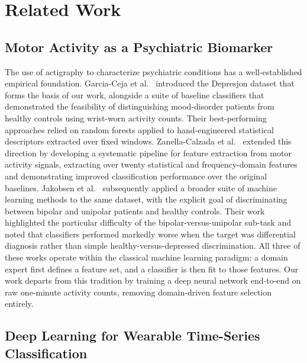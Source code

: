 \section{Related Work}
\label{sec:related}

\subsection{Motor Activity as a Psychiatric Biomarker}

The use of actigraphy to characterize psychiatric conditions has a well-established empirical foundation. Garcia-Ceja et al.\ \cite{garcia2018depresjon} introduced the Depresjon dataset that forms the basis of our work, alongside a suite of baseline classifiers that demonstrated the feasibility of distinguishing mood-disorder patients from healthy controls using wrist-worn activity counts. Their best-performing approaches relied on random forests applied to hand-engineered statistical descriptors extracted over fixed windows. Zanella-Calzada et al.\ \cite{zanella2019feature} extended this direction by developing a systematic pipeline for feature extraction from motor activity signals, extracting over twenty statistical and frequency-domain features and demonstrating improved classification performance over the original baselines. Jakobsen et al.\ \cite{jakobsen2020applying} subsequently applied a broader suite of machine learning methods to the same dataset, with the explicit goal of discriminating between bipolar and unipolar patients and healthy controls. Their work highlighted the particular difficulty of the bipolar-versus-unipolar sub-task and noted that classifiers performed markedly worse when the target was differential diagnosis rather than simple healthy-versus-depressed discrimination. All three of these works operate within the classical machine learning paradigm: a domain expert first defines a feature set, and a classifier is then fit to those features. Our work departs from this tradition by training a deep neural network end-to-end on raw one-minute activity counts, removing domain-driven feature selection entirely.

\subsection{Deep Learning for Wearable Time-Series Classification}

